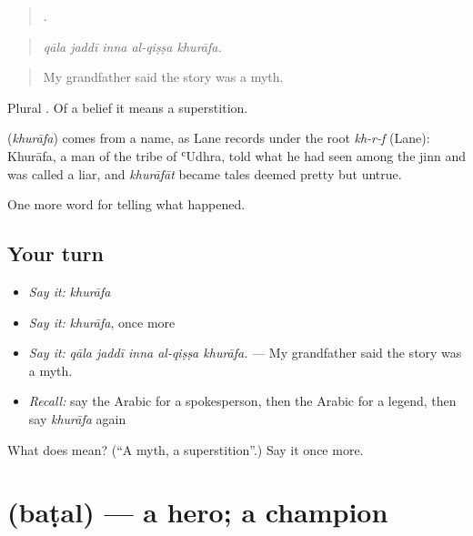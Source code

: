 \begin{quote}
    .
\end{quote}

\begin{quote}
\emph{qāla jaddī inna al-qiṣṣa khurāfa.}
\end{quote}

\begin{quote}
My grandfather said the story was a myth.
\end{quote}

Plural . Of a belief it means a superstition.

\begin{cousinweb}
\textbf{} (\emph{khurāfa}) comes from a name, as Lane records under the root \emph{kh-r-f} (Lane): Khurāfa, a man of the tribe of ʿUdhra, told what he had seen among the jinn and was called a liar, and \emph{khurāfāt} became tales deemed pretty but untrue.
\end{cousinweb}

\begin{grammarlens}[title={What you've built}]
One more word for telling what happened.
\end{grammarlens}

\subsection*{Your turn}
\begin{itemize}
\raggedright
  \item \emph{Say it:} \emph{khurāfa}
  \item \emph{Say it:} \emph{khurāfa}, once more
  \item \emph{Say it:} \emph{qāla jaddī inna al-qiṣṣa khurāfa.} — My grandfather said the story was a myth.
  \item \emph{Recall:} say the Arabic for a spokesperson, then the Arabic for a legend, then say \emph{khurāfa} again
\end{itemize}

\begin{tcolorbox}[breakable,colback=teal!4,colframe=teal!35!black,title={Before you move on}]
What does  mean? (\textquotedblleft{}A myth, a superstition\textquotedblright{}.) Say it once more.
\end{tcolorbox}
\section[\texorpdfstring{\ar{بطل} (baṭal)}{بطل (baṭal)}]{ (baṭal) — a hero; a champion}

